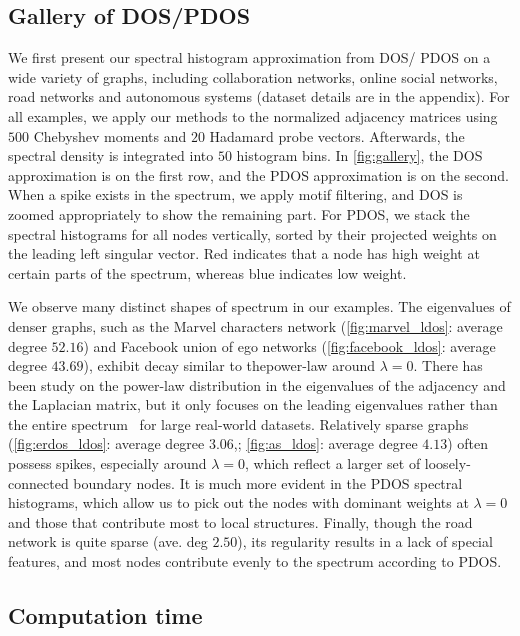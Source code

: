\subsection{Gallery of DOS/PDOS}
We first present our spectral histogram approximation from DOS/ PDOS on a wide
variety of graphs, including collaboration networks, online social networks,
road networks and autonomous systems (dataset details are in the appendix). For
all examples, we apply our methods to the normalized adjacency matrices using
$500$ Chebyshev moments and $20$ Hadamard probe vectors. Afterwards, the
spectral density is integrated into $50$ histogram bins. In \cref{fig:gallery},
the DOS approximation is on the first row, and the PDOS approximation is on the
second. When a spike exists in the spectrum, we apply motif filtering, and DOS
is zoomed appropriately to show the remaining part. For PDOS, we stack the
spectral histograms for all nodes vertically, sorted by their projected weights
on the leading left singular vector. Red indicates that a node has high weight
at certain parts of the spectrum, whereas blue indicates low weight.

We observe many distinct shapes of spectrum in our examples. The eigenvalues of
denser graphs, such as the Marvel characters network (\ref{fig:marvel_ldos}:
average degree $52.16$) and Facebook union of ego networks 
(\ref{fig:facebook_ldos}: average degree $43.69$), exhibit decay similar to
thepower-law around $\lambda=0$. There has been study on the power-law
distribution in the eigenvalues of the adjacency and the Laplacian matrix, but
it only focuses on the leading eigenvalues rather than the entire spectrum~
\cite{eikmeier2017revisiting} for large real-world datasets. Relatively sparse
graphs (\ref{fig:erdos_ldos}: average degree $3.06$,; \ref{fig:as_ldos}: average
degree $4.13$) often possess spikes, especially around $\lambda=0$, which
reflect a larger set of loosely-connected boundary nodes. It is much more
evident in the PDOS spectral histograms, which allow us to pick out the nodes
with dominant weights at $\lambda=0$ and those that contribute most to local
structures. Finally, though the road network is quite sparse (ave. deg $2.50$),
its regularity results in a lack of special features, and most nodes contribute
evenly to the spectrum according to PDOS.


\subsection{Computation time}

